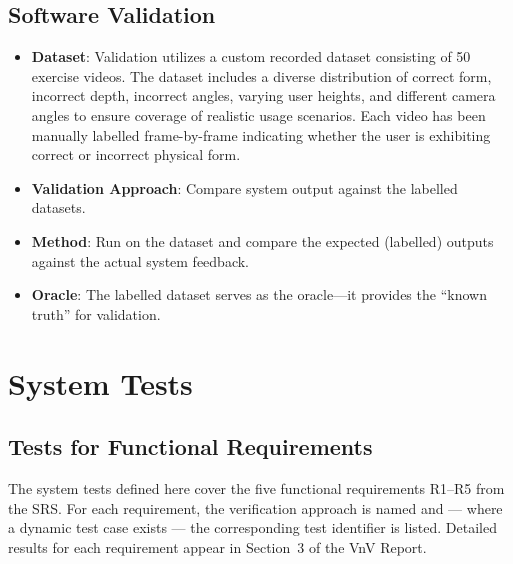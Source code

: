 \documentclass[12pt, titlepage]{article}
\begin{document}
\subsection{Software Validation}
\begin{itemize}
    \item \textbf{Dataset}: Validation utilizes a custom recorded dataset consisting of 50 exercise videos. The dataset includes a diverse distribution of correct form, incorrect depth, incorrect angles, varying user heights, and different camera angles to ensure coverage of realistic usage scenarios. Each video has been manually labelled frame-by-frame indicating whether the user is exhibiting correct or incorrect physical form.
    \item \textbf{Validation Approach}: Compare system output against the labelled datasets.
    \item \textbf{Method}: Run \progname{} on the dataset and compare the expected (labelled) outputs against the actual system feedback.
    \item \textbf{Oracle}: The labelled dataset serves as the oracle---it provides the ``known truth'' for validation.
\end{itemize}

\section{System Tests}\label{sec:systests}

\subsection{Tests for Functional Requirements}

The system tests defined here cover the five functional requirements
R1--R5 from the SRS. For each requirement, the verification approach is
named and --- where a dynamic test case exists --- the corresponding
test identifier is listed. Detailed results for each requirement appear
in Section~3 of the VnV Report.
\end{document}
